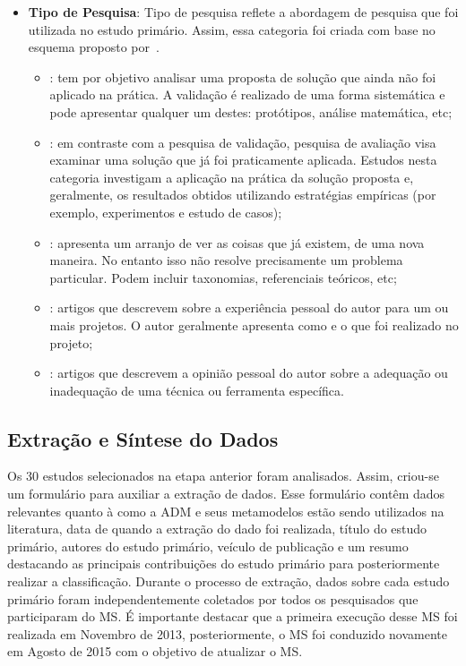 \begin{itemize}
        \item \textbf{Tipo de Pesquisa}: Tipo de pesquisa reflete a abordagem de pesquisa que foi utilizada no estudo primário. Assim, essa categoria foi criada com base no esquema proposto por~.
        
        \begin{itemize}
            \item {}: tem por objetivo analisar uma proposta de solução que ainda não foi aplicado na prática. A validação é realizado de uma forma sistemática e pode apresentar qualquer um destes: protótipos, análise matemática, etc;
            \item {}: em contraste com a pesquisa de validação, pesquisa de avaliação visa examinar uma solução que já foi praticamente aplicada. Estudos nesta categoria investigam a aplicação na prática da solução proposta e, geralmente, os resultados obtidos utilizando estratégias empíricas (por exemplo, experimentos e estudo de casos);
            \item {}: apresenta um arranjo de ver as coisas que já existem, de uma nova maneira. No entanto isso não resolve precisamente um problema particular. Podem incluir taxonomias, referenciais teóricos, etc;
            \item {}: artigos que descrevem sobre a experiência pessoal do autor para um ou mais projetos. O autor geralmente apresenta como e o que foi realizado no projeto;
            \item {}: artigos que descrevem a opinião pessoal do autor sobre a adequação ou inadequação de uma técnica ou ferramenta específica.
        \end{itemize}
    
\end{itemize}


\subsection{Extração e Síntese do Dados}

Os 30 estudos selecionados na etapa anterior foram analisados. Assim, criou-se um formulário para auxiliar a extração de dados. Esse formulário contêm dados relevantes quanto à como a ADM e seus metamodelos estão sendo utilizados na literatura, data de quando a extração do dado foi realizada, título do estudo primário, autores do estudo primário, veículo de publicação e um resumo destacando as principais contribuições do estudo primário para posteriormente realizar a classificação. Durante o processo de extração, dados sobre cada estudo primário foram independentemente coletados por todos os pesquisados que participaram do MS. É importante destacar que a primeira execução desse MS foi realizada em Novembro de 2013, posteriormente, o MS foi conduzido novamente em Agosto de 2015 com o objetivo de atualizar o MS.

